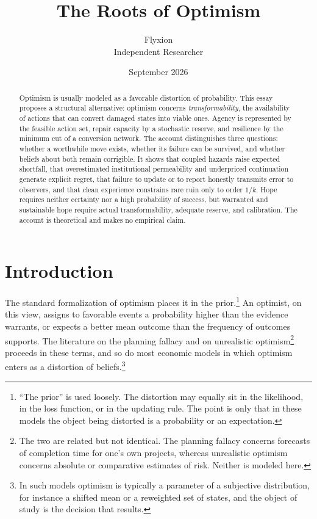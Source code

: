 \documentclass[11pt]{article}
\title{The Roots of Optimism}
\author{Flyxion\\ \small Independent Researcher}
\date{September 2026}
\theoremstyle{remark}
\begin{document}
\maketitle

\begin{abstract}
\noindent Optimism is usually modeled as a favorable distortion of probability. This essay proposes a structural alternative: optimism concerns \emph{transformability}, the availability of actions that can convert damaged states into viable ones. Agency is represented by the feasible action set, repair capacity by a stochastic reserve, and resilience by the minimum cut of a conversion network. The account distinguishes three questions: whether a worthwhile move exists, whether its failure can be survived, and whether beliefs about both remain corrigible. It shows that coupled hazards raise expected shortfall, that overestimated institutional permeability and underpriced continuation generate explicit regret, that failure to update or to report honestly transmits error to observers, and that clean experience constrains rare ruin only to order $1/k$. Hope requires neither certainty nor a high probability of success, but warranted and sustainable hope require actual transformability, adequate reserve, and calibration. The account is theoretical and makes no empirical claim.
\end{abstract}

\section{Introduction}

The standard formalization of optimism places it in the prior.\footnote{``The prior'' is used loosely. The distortion may equally sit in the likelihood, in the loss function, or in the updating rule. The point is only that in these models the object being distorted is a probability or an expectation.} An optimist, on this view, assigns to favorable events a probability higher than the evidence warrants, or expects a better mean outcome than the frequency of outcomes supports. The literature on the planning fallacy and on unrealistic optimism\footnote{The two are related but not identical. The planning fallacy concerns forecasts of completion time for one's own projects, whereas unrealistic optimism concerns absolute or comparative estimates of risk. Neither is modeled here.} proceeds in these terms, and so do most economic models in which optimism enters as a distortion of beliefs.\footnote{In such models optimism is typically a parameter of a subjective distribution, for instance a shifted mean or a reweighted set of states, and the object of study is the decision that results.}
\end{document}
